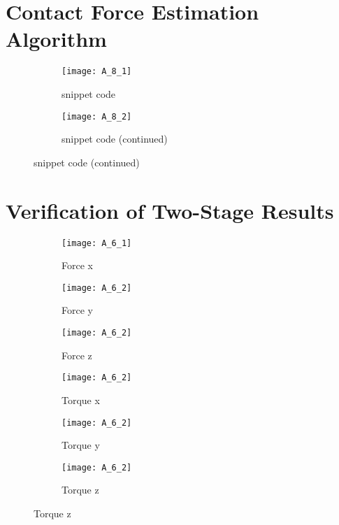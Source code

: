 \section*{Contact Force Estimation Algorithm}
\begin{figure}[H]
  \caption{Contact Force Estimation Algorithm}  
  \label{fig:algo code}
  \begin{subfigure}[t]{\textwidth}
    \centering
    \texttt{[image: A\_8\_1]} 
    \caption{snippet code}
  \end{subfigure}
  \begin{subfigure}[t]{\textwidth}
    \centering
    \texttt{[image: A\_8\_2]}
    \caption{snippet code (continued)}
  \end{subfigure}
\end{figure}

\section*{Verification of Two-Stage Results}
\begin{figure}[H]
  \caption{Static contact force}
  \label{fig:appendix static contact}  
  \begin{subfigure}[t]{0.5\textwidth}
    \centering
    \texttt{[image: A\_6\_1]} 
    \caption{Force x}
  \end{subfigure}
  \begin{subfigure}[t]{0.5\textwidth}
    \centering
    \texttt{[image: A\_6\_2]}
    \caption{Force y}
  \end{subfigure}
  \begin{subfigure}[t]{0.5\textwidth}
    \centering
    \texttt{[image: A\_6\_2]}
    \caption{Force z}
  \end{subfigure}
  \begin{subfigure}[t]{0.5\textwidth}
    \centering
    \texttt{[image: A\_6\_2]}
    \caption{Torque x}
  \end{subfigure}
  \begin{subfigure}[t]{0.5\textwidth}
    \centering
    \texttt{[image: A\_6\_2]}
    \caption{Torque y}
  \end{subfigure}
  \begin{subfigure}[t]{0.5\textwidth}
    \centering
    \texttt{[image: A\_6\_2]}
    \caption{Torque z}
  \end{subfigure}
\end{figure}

